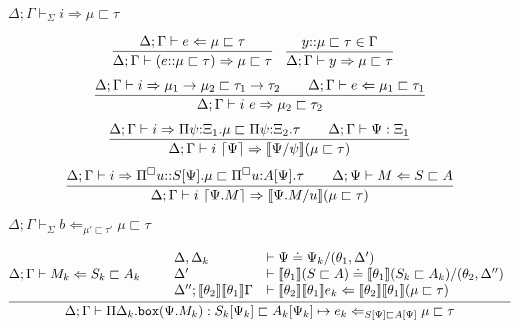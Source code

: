 \documentclass[letterpaper, 11pt]{article}
\newcommand{\Rar}{\Rightarrow}
\newcommand{\Lar}{\Leftarrow}
\newcommand{\rar}{\rightarrow}
\newcommand{\bbox}{\texttt{box}}
\begin{document}
    $\boxed{ \Delta; \Gamma \vdash_\Sigma i \Rar \mu \sqsubset \tau}$
    
    \begin{align*}
      & \infer{\Delta; \Gamma \vdash (e {::} \mu \sqsubset \tau) \Rar \mu \sqsubset \tau}
        {
          \Delta; \Gamma \vdash e \Lar \mu \sqsubset \tau
        } &
      & \infer{ \Delta; \Gamma \vdash y \Rar \mu \sqsubset \tau}{y{::}\mu \sqsubset \tau \in \Gamma}
    \end{align*}
    \begin{align*}
      \infer{ \Delta; \Gamma \vdash i \ e \Rar \mu_2 \sqsubset \tau_2}
            {
               \Delta; \Gamma \vdash i \Rar \mu_1 \rar \mu_2 \sqsubset \tau_1 \rar \tau_2
              &&
               \Delta; \Gamma \vdash e \Lar \mu_1 \sqsubset \tau_1
            }
    \end{align*}
    \begin{align*}
      \infer{ \Delta; \Gamma \vdash i \ \lceil \Psi \rceil \Rar \llbracket \Psi/\psi \rrbracket (\mu \sqsubset \tau)}
            {
               \Delta; \Gamma \vdash i \Rar \Pi \psi{:}\Xi_1. \mu \sqsubset \Pi \psi{:}\Xi_2. \tau
              &&
               \Delta; \Gamma \vdash \Psi : \Xi_1
            }
    \end{align*}
    \begin{align*}
      \infer{ \Delta; \Gamma \vdash i \ \lceil \Psi. M \rceil \Rar \llbracket \Psi. M / u \rrbracket (\mu \sqsubset \tau)}
            {
               \Delta; \Gamma \vdash i \Rar \Pi^\square u{::}S[\Psi]. \mu \sqsubset \Pi^\square u{:}A[\Psi]. \tau
              &&
               \Delta; \Psi \vdash M \Lar S \sqsubset A
            }
    \end{align*}

    $\boxed{ \Delta; \Gamma \vdash_\Sigma b \Lar_{\mu' \sqsubset \tau'} \mu \sqsubset \tau}$

    \begin{align*}
      \infer{ \Delta; \Gamma \vdash \Pi \Delta_k . \bbox(\Psi. M_k) : S_k[\Psi_k]  \sqsubset A_k[\Psi_k] \mapsto e_k 
                                                \Lar_{S[\Psi] \sqsubset A[\Psi]} \mu \sqsubset \tau}
            {
               \Delta; \Gamma \vdash M_k \Lar S_k \sqsubset A_k
              &&
              \begin{array}{ll}
                 \Delta, \Delta_k & \vdash \Psi \doteq \Psi_k / (\theta_1, \Delta') \\
                 \Delta'          & \vdash \llbracket \theta_1 \rrbracket ( S \sqsubset A) \doteq 
                                                  \llbracket \theta_1 \rrbracket(S_k \sqsubset A_k)/(\theta_2, \Delta'') \\
                 \Delta'';\llbracket \theta_2 \rrbracket \llbracket \theta_1 \rrbracket \Gamma & \vdash
                                        \llbracket \theta_2 \rrbracket \llbracket \theta_1 \rrbracket e_k 
                                        \Lar \llbracket \theta_2 \rrbracket \llbracket \theta_1 \rrbracket (\mu \sqsubset \tau)
              \end{array}
            }
    \end{align*}
\end{document}
